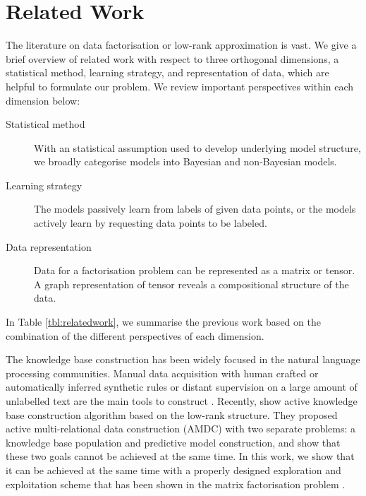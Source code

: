 
\section{Related Work}

The literature on data factorisation or low-rank approximation is vast. 
We give a brief overview of related work with respect to three
orthogonal dimensions, a statistical method, learning strategy, and 
representation of data, which are helpful to formulate our problem.
We review important perspectives within each dimension below:
\begin{description}
\item[Statistical method] With an statistical assumption used to develop 
underlying model structure, we broadly categorise models into Bayesian 
and non-Bayesian models.
\item[Learning strategy] The models passively learn from labels of given 
data points, or the models actively learn by  requesting data points 
to be labeled.
\item[Data representation] Data for a factorisation problem can be 
represented as a matrix or tensor. A graph representation of tensor reveals
a compositional structure of the data.
\end{description}
In Table \ref{tbl:relatedwork}, we summarise the previous work based on 
the combination of the different perspectives of each dimension.

The knowledge base construction has been widely focused in the natural 
language processing communities. Manual data acquisition with human crafted 
or automatically inferred synthetic rules or distant supervision on a large
amount of unlabelled text are the main tools to construct \cite{fader2011identifying,Mintz2009}.
Recently, \citet{kajino2015active} show active knowledge base construction
algorithm based on the low-rank structure. They proposed active 
multi-relational data construction (AMDC) with two separate problems: 
a knowledge base population and predictive model construction, and show 
that these two goals cannot be achieved at the same time. In this work, 
we show that it can be achieved at the same time with a properly designed
exploration and exploitation scheme that has been shown in the matrix 
factorisation problem \cite{kawale2015efficient}.


